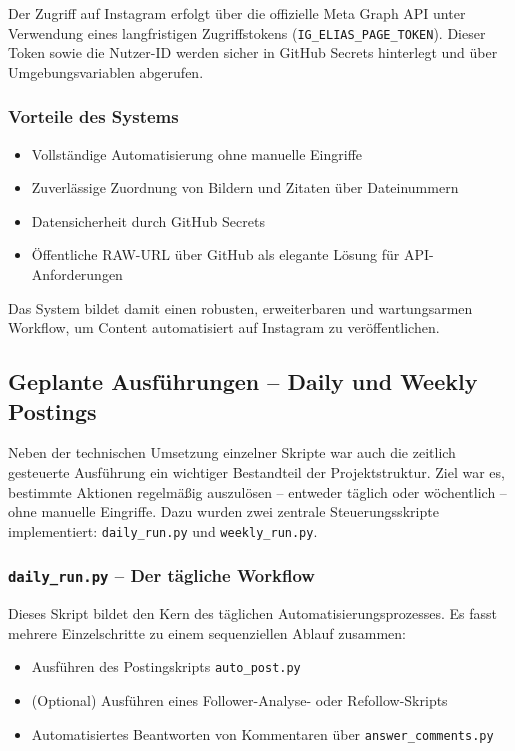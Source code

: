 \documentclass[a4paper,12pt]{article}
\begin{document}
Der Zugriff auf Instagram erfolgt über die offizielle Meta Graph API unter Verwendung eines langfristigen Zugriffstokens (\texttt{IG\_ELIAS\_PAGE\_TOKEN}). Dieser Token sowie die Nutzer-ID werden sicher in GitHub Secrets hinterlegt und über Umgebungsvariablen abgerufen.

\subsubsection*{Vorteile des Systems}

\begin{itemize}
    \item Vollständige Automatisierung ohne manuelle Eingriffe
    \item Zuverlässige Zuordnung von Bildern und Zitaten über Dateinummern
    \item Datensicherheit durch GitHub Secrets
    \item Öffentliche RAW-URL über GitHub als elegante Lösung für API-Anforderungen
\end{itemize}

Das System bildet damit einen robusten, erweiterbaren und wartungsarmen Workflow, um Content automatisiert auf Instagram zu veröffentlichen.

\subsection{Geplante Ausführungen – Daily und Weekly Postings}

Neben der technischen Umsetzung einzelner Skripte war auch die zeitlich gesteuerte Ausführung ein wichtiger Bestandteil der Projektstruktur. Ziel war es, bestimmte Aktionen regelmäßig auszulösen – entweder täglich oder wöchentlich – ohne manuelle Eingriffe. Dazu wurden zwei zentrale Steuerungsskripte implementiert: \texttt{daily\_run.py} und \texttt{weekly\_run.py}.

\subsubsection*{\texttt{daily\_run.py} – Der tägliche Workflow}

Dieses Skript bildet den Kern des täglichen Automatisierungsprozesses. Es fasst mehrere Einzelschritte zu einem sequenziellen Ablauf zusammen:

\begin{itemize}
    \item Ausführen des Postingskripts \texttt{auto\_post.py}
    \item (Optional) Ausführen eines Follower-Analyse- oder Refollow-Skripts
    \item Automatisiertes Beantworten von Kommentaren über \texttt{answer\_comments.py}
\end{itemize}
\end{document}

